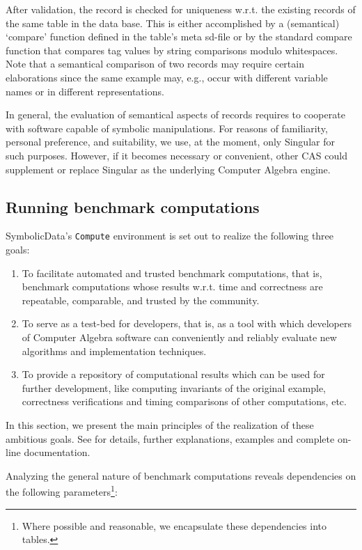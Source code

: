 \documentclass[11pt,a4paper]{article}
\newcommand{\SD}{{\sc Symbolic\-Data}}
\begin{document}
After validation, the record is checked for uniqueness w.r.t. the
existing records of the same table in the data base. This is either
accomplished by a (semantical) `compare' function defined in the
table's meta sd-file or by the standard compare function that compares
tag values by string comparisons modulo whitespaces. Note that a
semantical comparison of two records may require certain elaborations
since the same example may, e.g., occur with different variable names
or in different representations.

In general, the evaluation of semantical aspects of records requires to
cooperate with software capable of symbolic manipulations. For reasons
of familiarity, personal preference, and suitability, we use, at the
moment, only {\sc Singular} \cite{Singular} for such purposes.
However, if it becomes necessary or convenient, other CAS could
supplement or replace {\sc Singular} as the underlying Computer
Algebra engine.

\subsection{Running benchmark computations}

\SD's {\tt Compute} environment is set out to realize the following
three goals:
\begin{enumerate}
\item To facilitate automated and trusted benchmark computations,
  that is, benchmark computations whose results w.r.t. time and
  correctness are repeatable, comparable, and trusted by the
  community.
\item To serve as a test-bed for developers, that is, as a tool with
  which developers of Computer Algebra software can conveniently and
  reliably  evaluate new algorithms and implementation techniques.
\item To provide a repository of computational results which can be
used for further development, like computing invariants of the
original example, correctness verifications and timing comparisons of
other computations, etc.
\end{enumerate}

In this section, we present the main principles of the realization of
these ambitious goals. See \cite{SymbolicData} for details, further
explanations, examples and complete on-line documentation.
\medskip

Analyzing the general nature of benchmark computations reveals
dependencies on the following parameters\footnote{Where possible and
reasonable, we encapsulate these dependencies into tables.}:
\end{document}
